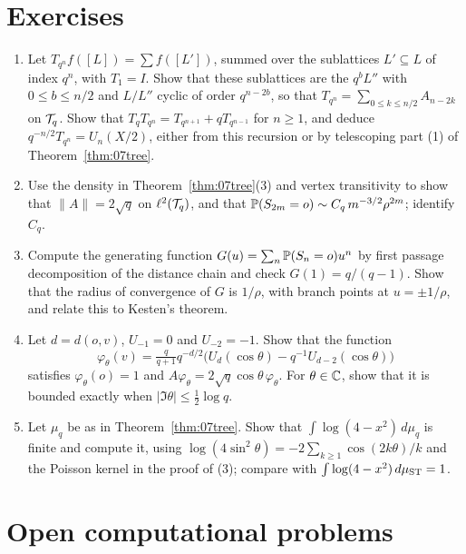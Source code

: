 \section{Exercises}

\begin{enumerate}
\item\label{ex:07hecke} Let $T_{q^n}f([L])=\sum f([L'])$, summed over the sublattices $L'\subseteq L$ of index $q^n$, with $T_1=I$. Show that these sublattices are the $q^bL''$ with $0\le b\le n/2$ and $L/L''$ cyclic of order $q^{n-2b}$, so that $T_{q^n}=\sum_{0\le k\le n/2}A_{n-2k}$ on $\mathcal{T}_q$. Show that $T_qT_{q^n}=T_{q^{n+1}}+qT_{q^{n-1}}$ for $n\ge1$, and deduce $q^{-n/2}T_{q^n}=U_n(X/2)$, either from this recursion or by telescoping part (1) of Theorem~\ref{thm:07tree}.
\item Use the density in Theorem~\ref{thm:07tree}(3) and vertex transitivity to show that $\|A\|=2\sqrt q$ on $\ell^2(\mathcal{T}_q)$, and that $\mathbb{P}(S_{2m}=o)\sim C_q\,m^{-3/2}\rho^{2m}$; identify $C_q$.
\item Compute the generating function $G(u)=\sum_n\mathbb{P}(S_n=o)u^n$ by first passage decomposition of the distance chain and check $G(1)=q/(q-1)$. Show that the radius of convergence of $G$ is $1/\rho$, with branch points at $u=\pm1/\rho$, and relate this to Kesten's theorem.
\item Let $d=d(o,v)$, $U_{-1}=0$ and $U_{-2}=-1$. Show that the function
\[
\varphi_\theta(v)=\tfrac{q}{q+1}q^{-d/2}\bigl(U_{d}(\cos\theta)-q^{-1}U_{d-2}(\cos\theta)\bigr)
\]
satisfies $\varphi_\theta(o)=1$ and $A\varphi_\theta=2\sqrt q\cos\theta\,\varphi_\theta$. For $\theta\in\mathbb{C}$, show that it is bounded exactly when $|\Im\theta|\le\frac12\log q$.
\item Let $\mu_q$ be as in Theorem~\ref{thm:07tree}. Show that $\int\log(4-x^2)\,d\mu_q$ is finite and compute it, using $\log(4\sin^2\theta)=-2\sum_{k\ge1}\cos(2k\theta)/k$ and the Poisson kernel in the proof of (3); compare with $\int\log(4-x^2)\,d\mu_{\mathrm{ST}}=1$.
\end{enumerate}

\section{Open computational problems}

